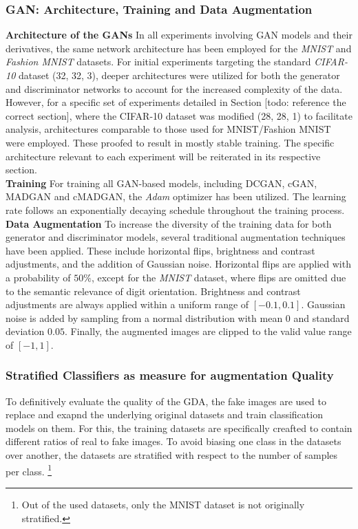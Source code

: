 \subsubsection{GAN: Architecture, Training and Data Augmentation}

\noindent\textbf{Architecture of the GANs}
In all experiments involving GAN models and their derivatives, the same network architecture has been employed for the \textit{MNIST} and \textit{Fashion MNIST} datasets. For initial experiments targeting the standard \textit{CIFAR-10} dataset (32, 32, 3), deeper architectures were utilized for both the generator and discriminator networks to account for the increased complexity of the data. However, for a specific set of experiments detailed in Section [todo: reference the correct section], where the CIFAR-10 dataset was modified (28, 28, 1) to facilitate analysis, architectures comparable to those used for MNIST/Fashion MNIST were employed. These proofed to result in mostly stable training. The specific architecture relevant to each experiment will be reiterated in its respective section.\\

\noindent\textbf{Training}
For training all GAN-based models, including DCGAN, cGAN, MADGAN and cMADGAN, the \textit{Adam} optimizer has been utilized. The learning rate follows an exponentially decaying schedule throughout the training process.\\

\noindent\textbf{Data Augmentation}\label{body_experiment_dataaugmentation}
To increase the diversity of the training data for both generator and discriminator models, several traditional augmentation techniques have been applied. These include horizontal flips, brightness and contrast adjustments, and the addition of Gaussian noise.
Horizontal flips are applied with a probability of \(50\%\), except for the \textit{MNIST} dataset, where flips are omitted due to the semantic relevance of digit orientation. Brightness and contrast adjustments are always applied within a uniform range of \([-0.1, 0.1]\). Gaussian noise is added by sampling from a normal distribution with mean \(0\) and standard deviation \(0.05\). Finally, the augmented images are clipped to the valid value range of \([-1, 1]\).

\subsubsection{Stratified Classifiers as measure for augmentation Quality}
To definitively evaluate the quality of the GDA, the fake images are used to replace and exapnd the underlying original datasets and train classification models on them. For this, the training datasets are specifically creafted to contain different ratios of real to fake images. To avoid biasing one class in the datasets over another, the datasets are stratified with respect to the number of samples per class. \footnote{Out of the used datasets, only the MNIST dataset is not originally stratified.}

